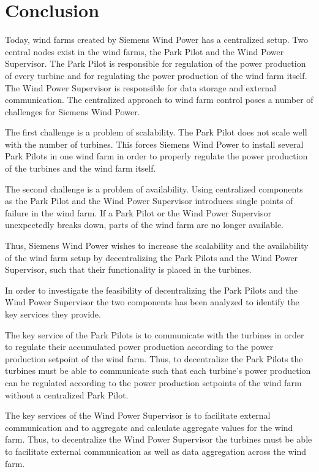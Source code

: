 \chapter{Conclusion}
Today, wind farms created by Siemens Wind Power has a centralized setup. Two central nodes exist in the wind farms, the Park Pilot and the Wind Power Supervisor. The Park Pilot is responsible for regulation of the power production of every turbine and for regulating the power production of the wind farm itself. The Wind Power Supervisor is responsible for data storage and external communication. The centralized approach to wind farm control poses a number of challenges for Siemens Wind Power.

The first challenge is a problem of scalability. The Park Pilot does not scale well with the number of turbines. This forces Siemens Wind Power to install several Park Pilots in one wind farm in order to properly regulate the power production of the turbines and the wind farm itself.

The second challenge is a problem of availability. Using centralized components as the Park Pilot and the Wind Power Supervisor introduces single points of failure in the wind farm. If a Park Pilot or the Wind Power Supervisor unexpectedly breaks down, parts of the wind farm are no longer available.

Thus, Siemens Wind Power wishes to increase the scalability and the availability of the wind farm setup by decentralizing the Park Pilots and the Wind Power Supervisor, such that their functionality is placed in the turbines.

In order to investigate the feasibility of decentralizing the Park Pilots and the Wind Power Supervisor the two components has been analyzed to identify the key services they provide.

The key service of the Park Pilots is to communicate with the turbines in order to regulate their accumulated power production according to the power production setpoint of the wind farm. Thus, to decentralize the Park Pilots the turbines must be able to communicate such that each turbine's power production can be regulated according to the power production setpoints of the wind farm without a centralized Park Pilot.

The key services of the Wind Power Supervisor is to facilitate external communication and to aggregate and calculate aggregate values for the wind farm. Thus, to decentralize the Wind Power Supervisor the turbines must be able to facilitate external communication as well as data aggregation across the wind farm.

